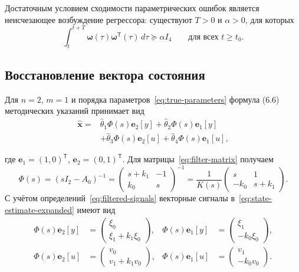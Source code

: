 Достаточным условием сходимости параметрических ошибок является
неисчезающее возбуждение регрессора: существуют $T>0$ и $\alpha>0$,
для которых
\begin{equation}
  \int_t^{t+T}\bm\omega(\tau)\bm\omega^{\mathsf T}(\tau)\,d\tau
  \succeq\alpha I_4
  \qquad\text{для всех }t\ge t_0.
  \label{eq:pe}
\end{equation}
\begin{samepage}
\subsection{Восстановление вектора состояния}

Для $n=2$, $m=1$ и порядка параметров~\eqref{eq:true-parameters}
формула (6.6) методических указаний принимает вид
\begin{equation}
  \begin{aligned}
    \hat{\bm x}={}&
    \hat\theta_1\Phi(s)\bm e_2[y]
    +\hat\theta_2\Phi(s)\bm e_1[y]\\
    &+\hat\theta_3\Phi(s)\bm e_2[u]
    +\hat\theta_4\Phi(s)\bm e_1[u],
  \end{aligned}
  \label{eq:state-estimate-expanded}
\end{equation}
\end{samepage}
где $\bm e_1=(1,0)^{\mathsf T}$, $\bm e_2=(0,1)^{\mathsf T}$.
Для матрицы~\eqref{eq:filter-matrix} получаем
\begin{equation}
  \Phi(s)=(sI_2-A_0)^{-1}
  =
  \begin{pmatrix}s+k_1&-1\\k_0&s\end{pmatrix}^{-1}
  =
  \frac{1}{K(s)}
  \begin{pmatrix}s&1\\-k_0&s+k_1\end{pmatrix}.
  \label{eq:filter-resolvent}
\end{equation}
С учётом определений~\eqref{eq:filtered-signals} векторные сигналы
в~\eqref{eq:state-estimate-expanded} имеют вид
\begin{equation}
  \begin{aligned}
    \Phi(s)\bm e_2[y]
      &=\begin{pmatrix}\xi_0\\\xi_1+k_1\xi_0\end{pmatrix},
    &\Phi(s)\bm e_1[y]
      &=\begin{pmatrix}\xi_1\\-k_0\xi_0\end{pmatrix},\\[0.6em]
    \Phi(s)\bm e_2[u]
      &=\begin{pmatrix}v_0\\v_1+k_1v_0\end{pmatrix},
    &\Phi(s)\bm e_1[u]
      &=\begin{pmatrix}v_1\\-k_0v_0\end{pmatrix}.
  \end{aligned}
  \label{eq:vector-filter-signals}
\end{equation}
